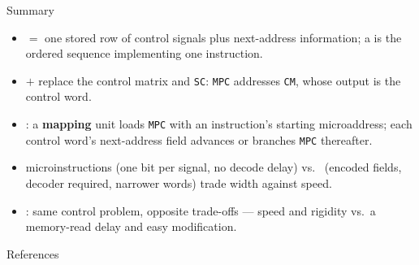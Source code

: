 \documentclass[aspectratio=169]{beamer}
\begin{document}
\begin{frame}{Summary}
  \begin{itemize}
    \item {} $=$ one stored row of control
      signals plus next-address information; a  is the
      ordered sequence implementing one instruction.
    \item {} $+$  replace the control matrix and \texttt{SC}: \texttt{MPC}
      addresses \texttt{CM}, whose output is the control word.
    \item {}: a \textbf{mapping} unit loads \texttt{MPC}
      with an instruction's starting microaddress; each control word's
      next-address field advances or branches \texttt{MPC} thereafter.
    \item {} microinstructions (one bit per signal, no decode
      delay) vs.\  (encoded fields, decoder required, narrower
      words) trade width against speed.
    \item {}: same control problem, opposite
      trade-offs --- speed and rigidity vs.\ a memory-read delay and
      easy modification.
  \end{itemize}
\end{frame}

\begin{frame}{References}
  \footnotesize
  
  
\end{frame}
\end{document}
